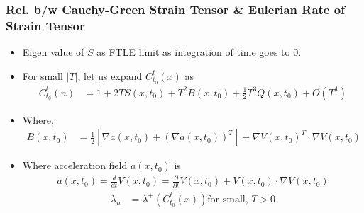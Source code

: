 \documentclass[../presentation.tex]{subfiles}
\begin{document}
\begin{frame}
  \frametitle{\small Rel. b/w Cauchy-Green Strain Tensor \& Eulerian Rate of Strain Tensor}

  \begin{itemize}
    \item Eigen value of \(S\) as FTLE limit as integration of time goes to 0. \par

    \item For small \(|T|\), let us expand  \(C_{t_0}^t (x)\) as
    \begin{equation}
      \begin{aligned}
        C_{t_0}^t (n) &= 1 + 2T S(x, t_0) + T^2 B(x, t_0) + \frac{1}{2} T^3 Q(x, t_0) + O(T^4)
      \end{aligned}
    \end{equation}
  
    \item Where,
    \begin{equation}
      \begin{aligned}
        B(x, t_0) &= \frac{1}{2}[\nabla a(x, t_0) + (\nabla a(x, t_0))^T] + \nabla V(x, t_0)^T \cdot \nabla V(x, t_0)
      \end{aligned}
    \end{equation}
    
    \item Where acceleration field \(a(x, t_0)\) is
    \begin{equation}
      \begin{aligned}
        a(x, t_0) = \frac{d}{dt}V(x, t_0) = \frac{\partial}{\partial t} V(x, t_0) + V(x, t_0) \cdot \nabla V(x, t_0)
      \end{aligned}
    \end{equation}
    \begin{equation}
      \begin{aligned}
        \lambda_n &= \lambda^+ (C_{t_0}^t (x)) \text{for small, } T > 0
      \end{aligned}
    \end{equation}
  \end{itemize}
\end{frame}
\end{document}
